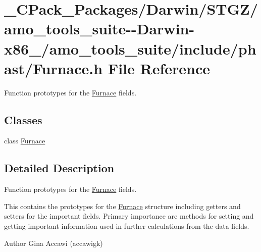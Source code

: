 \hypertarget{___c_pack___packages_2_darwin_2_s_t_g_z_2amo__tools__suite--_darwin-x86__64_2amo__tools__suite_2include_2phast_2_furnace_8h}{}\section{\+\_\+\+C\+Pack\+\_\+\+Packages/\+Darwin/\+S\+T\+G\+Z/amo\+\_\+tools\+\_\+suite-\/-\/\+Darwin-\/x86\+\_/amo\+\_\+tools\+\_\+suite/include/phast/\+Furnace.h File Reference}
\label{___c_pack___packages_2_darwin_2_s_t_g_z_2amo__tools__suite--_darwin-x86__64_2amo__tools__suite_2include_2phast_2_furnace_8h}


Function prototypes for the \hyperlink{class_furnace}{Furnace} fields.  


\subsection*{Classes}
\begin{DoxyCompactItemize}
\item 
class \hyperlink{class_furnace}{Furnace}
\end{DoxyCompactItemize}


\subsection{Detailed Description}
Function prototypes for the \hyperlink{class_furnace}{Furnace} fields. 

This contains the prototypes for the \hyperlink{class_furnace}{Furnace} structure including getters and setters for the important fields. Primary importance are methods for setting and getting important information used in further calculations from the data fields.

\begin{DoxyAuthor}{Author}
Gina Accawi (accawigk) 
\end{DoxyAuthor}
